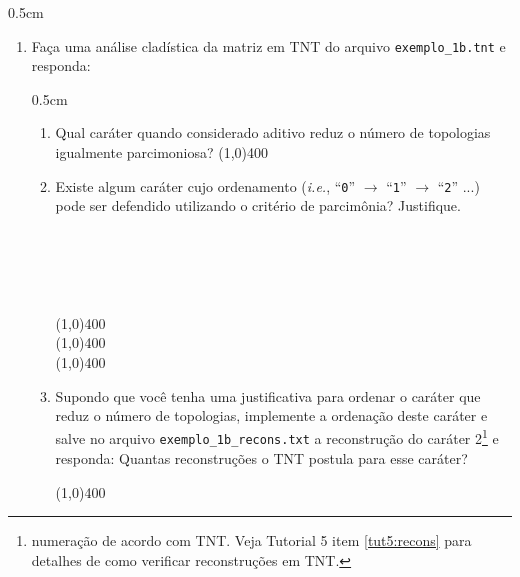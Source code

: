 \begin{refsection}
\begin {myindentpar}{0.5cm}
\begin{enumerate}[\itshape i.]
\begin {myindentpar}{0.5cm}
\begin{enumerate}[\itshape a.]
		\end{enumerate}
		\end{myindentpar}

	\item{Faça uma análise cladística da matriz em TNT do arquivo \texttt{exemplo\_1b.tnt} e responda:}
		\begin {myindentpar}{0.5cm}
		\begin{enumerate}[\itshape a.]
		\item{Qual caráter quando considerado aditivo reduz o número de topologias igualmente parcimoniosa?}
		\line(1,0){400}\\

		\item{Existe algum caráter cujo ordenamento  (\textit{i.e.}, ``\texttt{0}'' $\rightarrow$ ``\texttt{1}'' $\rightarrow$ ``\texttt{2}'' ...)  pode ser defendido utilizando o critério de parcimônia? Justifique.}
\\
\\
\\
\\
\\
\\
		\line(1,0){400}\\
		\line(1,0){400}\\
		\line(1,0){400}\\
		\item{Supondo que você tenha uma justificativa para ordenar o caráter que reduz o número de topologias, implemente a ordenação deste caráter e salve no arquivo \texttt{exemplo\_1b\_recons.txt} a reconstrução do caráter 2\footnote{numeração de acordo com TNT. Veja Tutorial 5 item \ref{tut5:recons} para detalhes de como verificar reconstruções em TNT.} e responda: Quantas reconstruções o TNT postula para esse caráter?}

		\line(1,0){400}\\

		\end{enumerate}
		\end{myindentpar}
\end{enumerate}
\end{myindentpar}


\end{refsection}
